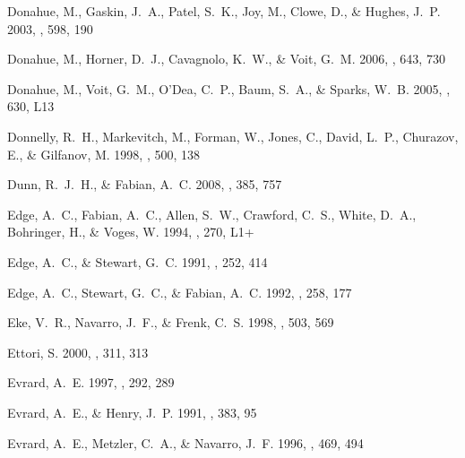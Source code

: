 \documentclass[12pt,preprint]{aastex}
\begin{document}
\begin{thebibliography}{137}
{Donahue}, M., {Gaskin}, J.~A., {Patel}, S.~K., {Joy}, M., {Clowe}, D., \&
  {Hughes}, J.~P. 2003, \apj, 598, 190

{Donahue}, M., {Horner}, D.~J., {Cavagnolo}, K.~W., \& {Voit}, G.~M. 2006,
  \apj, 643, 730

{Donahue}, M., {Voit}, G.~M., {O'Dea}, C.~P., {Baum}, S.~A., \& {Sparks}, W.~B.
  2005, \apjl, 630, L13

{Donnelly}, R.~H., {Markevitch}, M., {Forman}, W., {Jones}, C., {David}, L.~P.,
  {Churazov}, E., \& {Gilfanov}, M. 1998, \apj, 500, 138

{Dunn}, R.~J.~H., \& {Fabian}, A.~C. 2008, \mnras, 385, 757

{Edge}, A.~C., {Fabian}, A.~C., {Allen}, S.~W., {Crawford}, C.~S., {White},
  D.~A., {Bohringer}, H., \& {Voges}, W. 1994, \mnras, 270, L1+

{Edge}, A.~C., \& {Stewart}, G.~C. 1991, \mnras, 252, 414

{Edge}, A.~C., {Stewart}, G.~C., \& {Fabian}, A.~C. 1992, \mnras, 258, 177

{Eke}, V.~R., {Navarro}, J.~F., \& {Frenk}, C.~S. 1998, \apj, 503, 569

{Ettori}, S. 2000, \mnras, 311, 313

{Evrard}, A.~E. 1997, \mnras, 292, 289

{Evrard}, A.~E., \& {Henry}, J.~P. 1991, \apj, 383, 95

{Evrard}, A.~E., {Metzler}, C.~A., \& {Navarro}, J.~F. 1996, \apj, 469, 494


\end{thebibliography}
\end{document}
